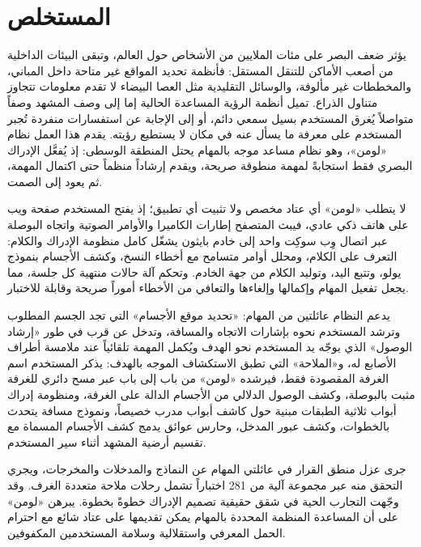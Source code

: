 \cleardoublepage
{}
\chapter*{المستخلص}

يؤثر ضعف البصر على مئات الملايين من الأشخاص حول العالم، وتبقى البيئات الداخلية من أصعب الأماكن للتنقل المستقل: فأنظمة تحديد المواقع غير متاحة داخل المباني، والمخططات غير مألوفة، والوسائل التقليدية مثل العصا البيضاء لا تقدم معلومات تتجاوز متناول الذراع. تميل أنظمة الرؤية المساعدة الحالية إما إلى وصف المشهد وصفاً متواصلاً يُغرق المستخدم بسيل سمعي دائم، أو إلى الإجابة عن استفسارات منفردة تُجبر المستخدم على معرفة ما يسأل عنه في مكان لا يستطيع رؤيته. يقدم هذا العمل نظام «لومن»، وهو نظام مساعد موجه بالمهام يحتل المنطقة الوسطى: إذ يُفعَّل الإدراك البصري فقط استجابةً لمهمة منطوقة صريحة، ويقدم إرشاداً منظماً حتى اكتمال المهمة، ثم يعود إلى الصمت.

لا يتطلب «لومن» أي عتاد مخصص ولا تثبيت أي تطبيق؛ إذ يفتح المستخدم صفحة ويب على هاتف ذكي عادي، فيبث المتصفح إطارات الكاميرا والأوامر الصوتية واتجاه البوصلة عبر اتصال وِب سوكِت واحد إلى خادم بايثون يشغّل كامل منظومة الإدراك والكلام: التعرف على الكلام، ومحلل أوامر متسامح مع أخطاء النسخ، وكشف الأجسام بنموذج يولو، وتتبع اليد، وتوليد الكلام من جهة الخادم. وتحكم آلة حالات منتهية كل جلسة، مما يجعل تفعيل المهام وإكمالها وإلغاءها والتعافي من الأخطاء أموراً صريحة وقابلة للاختبار.

يدعم النظام عائلتين من المهام: «تحديد موقع الأجسام» التي تجد الجسم المطلوب وترشد المستخدم نحوه بإشارات الاتجاه والمسافة، وتدخل عن قرب في طور «إرشاد الوصول» الذي يوجّه يد المستخدم نحو الهدف ويُكمل المهمة تلقائياً عند ملامسة أطراف الأصابع له، و«الملاحة» التي تطبق الاستكشاف الموجه بالهدف: يذكر المستخدم اسم الغرفة المقصودة فقط، فيرشده «لومن» من باب إلى باب عبر مسح دائري للغرفة مثبت بالبوصلة، وكشف الوصول الدلالي من الأجسام الدالة على الغرفة، ومنظومة إدراك أبواب ثلاثية الطبقات مبنية حول كاشف أبواب مدرب خصيصاً، ونموذج مسافة يتحدث بالخطوات، وكشف عبور المدخل، وحارس عوائق يدمج كشف الأجسام المسماة مع تقسيم أرضية المشهد أثناء سير المستخدم.

جرى عزل منطق القرار في عائلتي المهام عن النماذج والمدخلات والمخرجات، ويجري التحقق منه عبر مجموعة آلية من 281 اختباراً تشمل رحلات ملاحة متعددة الغرف. وقد وجّهت التجارب الحية في شقق حقيقية تصميم الإدراك خطوةً بخطوة. يبرهن «لومن» على أن المساعدة المنظمة المحددة بالمهام يمكن تقديمها على عتاد شائع مع احترام الحمل المعرفي واستقلالية وسلامة المستخدمين المكفوفين.

